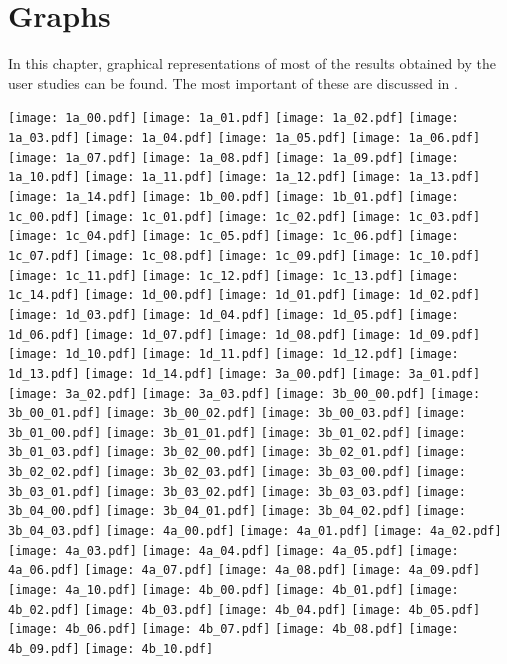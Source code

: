 \chapter{Graphs}
\vspace{-.4cm}
In this chapter, graphical representations of most of the results obtained by the user studies can be found. The most important of these are discussed in .
\vspace{-.6cm}

\graphicspath{ {/home/jimi/Dropbox/MasterProject/results/graphs/} }
\begin{center}
\texttt{[image: 1a\_00.pdf]}
\texttt{[image: 1a\_01.pdf]}
\texttt{[image: 1a\_02.pdf]}
\texttt{[image: 1a\_03.pdf]}
\texttt{[image: 1a\_04.pdf]}
\texttt{[image: 1a\_05.pdf]}
\texttt{[image: 1a\_06.pdf]}
\texttt{[image: 1a\_07.pdf]}
\texttt{[image: 1a\_08.pdf]}
\texttt{[image: 1a\_09.pdf]}
\texttt{[image: 1a\_10.pdf]}
\texttt{[image: 1a\_11.pdf]}
\texttt{[image: 1a\_12.pdf]}
\texttt{[image: 1a\_13.pdf]}
\texttt{[image: 1a\_14.pdf]}
\texttt{[image: 1b\_00.pdf]}
\texttt{[image: 1b\_01.pdf]}
\texttt{[image: 1c\_00.pdf]}
\texttt{[image: 1c\_01.pdf]}
\texttt{[image: 1c\_02.pdf]}
\texttt{[image: 1c\_03.pdf]}
\texttt{[image: 1c\_04.pdf]}
\texttt{[image: 1c\_05.pdf]}
\texttt{[image: 1c\_06.pdf]}
\texttt{[image: 1c\_07.pdf]}
\texttt{[image: 1c\_08.pdf]}
\texttt{[image: 1c\_09.pdf]}
\texttt{[image: 1c\_10.pdf]}
\texttt{[image: 1c\_11.pdf]}
\texttt{[image: 1c\_12.pdf]}
\texttt{[image: 1c\_13.pdf]}
\texttt{[image: 1c\_14.pdf]}
\texttt{[image: 1d\_00.pdf]}
\texttt{[image: 1d\_01.pdf]}
\texttt{[image: 1d\_02.pdf]}
\texttt{[image: 1d\_03.pdf]}
\texttt{[image: 1d\_04.pdf]}
\texttt{[image: 1d\_05.pdf]}
\texttt{[image: 1d\_06.pdf]}
\texttt{[image: 1d\_07.pdf]}
\texttt{[image: 1d\_08.pdf]}
\texttt{[image: 1d\_09.pdf]}
\texttt{[image: 1d\_10.pdf]}
\texttt{[image: 1d\_11.pdf]}
\texttt{[image: 1d\_12.pdf]}
\texttt{[image: 1d\_13.pdf]}
\texttt{[image: 1d\_14.pdf]}
\texttt{[image: 3a\_00.pdf]}
\texttt{[image: 3a\_01.pdf]}
\texttt{[image: 3a\_02.pdf]}
\texttt{[image: 3a\_03.pdf]}
\texttt{[image: 3b\_00\_00.pdf]}
\texttt{[image: 3b\_00\_01.pdf]}
\texttt{[image: 3b\_00\_02.pdf]}
\texttt{[image: 3b\_00\_03.pdf]}
\texttt{[image: 3b\_01\_00.pdf]}
\texttt{[image: 3b\_01\_01.pdf]}
\texttt{[image: 3b\_01\_02.pdf]}
\texttt{[image: 3b\_01\_03.pdf]}
\texttt{[image: 3b\_02\_00.pdf]}
\texttt{[image: 3b\_02\_01.pdf]}
\texttt{[image: 3b\_02\_02.pdf]}
\texttt{[image: 3b\_02\_03.pdf]}
\texttt{[image: 3b\_03\_00.pdf]}
\texttt{[image: 3b\_03\_01.pdf]}
\texttt{[image: 3b\_03\_02.pdf]}
\texttt{[image: 3b\_03\_03.pdf]}
\texttt{[image: 3b\_04\_00.pdf]}
\texttt{[image: 3b\_04\_01.pdf]}
\texttt{[image: 3b\_04\_02.pdf]}
\texttt{[image: 3b\_04\_03.pdf]}
\texttt{[image: 4a\_00.pdf]}
\texttt{[image: 4a\_01.pdf]}
\texttt{[image: 4a\_02.pdf]}
\texttt{[image: 4a\_03.pdf]}
\texttt{[image: 4a\_04.pdf]}
\texttt{[image: 4a\_05.pdf]}
\texttt{[image: 4a\_06.pdf]}
\texttt{[image: 4a\_07.pdf]}
\texttt{[image: 4a\_08.pdf]}
\texttt{[image: 4a\_09.pdf]}
\texttt{[image: 4a\_10.pdf]}
\texttt{[image: 4b\_00.pdf]}
\texttt{[image: 4b\_01.pdf]}
\texttt{[image: 4b\_02.pdf]}
\texttt{[image: 4b\_03.pdf]}
\texttt{[image: 4b\_04.pdf]}
\texttt{[image: 4b\_05.pdf]}
\texttt{[image: 4b\_06.pdf]}
\texttt{[image: 4b\_07.pdf]}
\texttt{[image: 4b\_08.pdf]}
\texttt{[image: 4b\_09.pdf]}
\texttt{[image: 4b\_10.pdf]}
\end{center}
